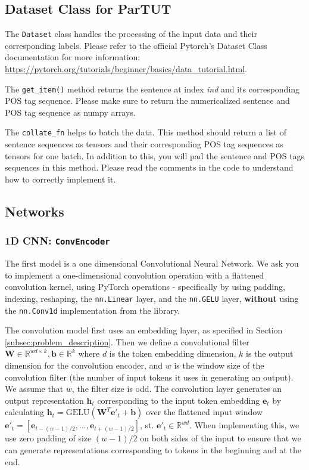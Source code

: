 \documentclass[11pt,addpoints,answers]{exam}
\newcommand{\bv}{\mathbf{b}}
\newcommand{\ev}{\mathbf{e}}
\newcommand{\hv}{\mathbf{h}}
\newcommand{\Wv}{\mathbf{W}}
\begin{document}
\subsection{Dataset Class for ParTUT}
The \lstinline{Dataset} class handles the processing of the input data and their corresponding labels. Please refer to the official Pytorch's Dataset Class documentation for more information:
\url{https://pytorch.org/tutorials/beginner/basics/data_tutorial.html}.

The \lstinline{get_item()} method returns the sentence at index \textit{ind} and its corresponding POS tag sequence. Please make sure to return the numericalized sentence and POS tag sequence as numpy arrays. 

The \lstinline{collate_fn} helps to batch the data. This method should return a list of sentence sequences as tensors and their corresponding POS tag sequences as tensors for one batch. In addition to this, you will pad the sentence and POS tags sequences in this method. Please read the comments in the code to understand how to correctly implement it.

\subsection{Networks}

\subsubsection{1D CNN: \lstinline{ConvEncoder}}
The first model is a one dimensional Convolutional Neural Network. We ask you to implement a one-dimensional convolution operation with a flattened convolution kernel, using PyTorch operations - specifically by using padding, indexing, reshaping, the \lstinline{nn.Linear} layer, and the \lstinline{nn.GELU} layer, \textbf{without} using the \lstinline{nn.Conv1d} implementation from the library.

The convolution model first uses an embedding layer, as specified in Section \ref{subsec:problem_description}. Then we define a convolutional filter $\Wv \in \mathbb{R}^{wd \times k}, \bv \in \mathbb{R}^{k}$ where $d$ is the token embedding dimension, $k$ is the output dimension for the convolution encoder, and $w$ is the window size of the convolution filter (the number of input tokens it uses in generating an output). We assume that $w$, the filter size is odd. The convolution layer generates an output representation $\hv_t$ corresponding to the input token embedding $\ev_t$ by calculating $\hv_t = \text{GELU}(\Wv^T \ev'_t + \bv)$ over the flattened input window $\ev'_t = [\ev_{t-(w-1)/2}, ..., \ev_{t+(w-1)/2}]$, st. $\ev'_t \in \mathbb{R}^{wd}$. When implementing this, we use zero padding of size $(w-1)/2$ on both sides of the input to ensure that we can generate representations corresponding to tokens in the beginning and at the end.
\end{document}
